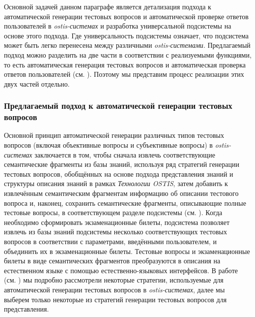 Основной задачей данном параграфе является детализация подхода к автоматической генерации тестовых вопросов и автоматической проверке ответов пользователей в \textit{ostis-системах} и разработка универсальной подсистемы на основе этого подхода. Где универсальность подсистемы означает, что подсистема может быть легко перенесена между различными \textit{ostis-системами}. Предлагаемый подход можно разделить на две части в соответствии с реализуемыми функциями, то есть автоматическая генерация тестовых вопросов и автоматическая проверка ответов пользователей (см. ). Поэтому мы представим процесс реализации этих двух частей отдельно.

\subsubsection{Предлагаемый подход к автоматической генерации тестовых вопросов}
\label{subsubsec_proposed_approach_automatic_generation_test_questions}

Основной принцип автоматической генерации различных типов тестовых вопросов (включая объективные вопросы и субъективные вопросы) в \textit{ostis-системах} заключается в том, чтобы сначала извлечь соответствующие семантические фрагменты из базы знаний, используя ряд стратегий генерации тестовых вопросов, обобщённых на основе подхода представления знаний и структуры описания знаний в рамках \textit{Технологии OSTIS}, затем добавить к извлечённым семантическим фрагментам информацию об описании тестового вопроса и, наконец, сохранить семантические фрагменты, описывающие полные тестовые вопросы, в соответствующем разделе подсистемы (см. ). Когда необходимо сформировать экзаменационные билеты, подсистема позволяет извлечь из базы знаний подсистемы несколько соответствующих тестовых вопросов в соответствии с параметрами, введёнными пользователем, и объединить их в экзаменационные билеты. Тестовые вопросы и экзаменационные билеты в виде семантических фрагментов преобразуются в описания на естественном языке с помощью естественно-языковых интерфейсов. В работе (см. ) мы подробно рассмотрели некоторые стратегии, используемые для автоматической генерации тестовых вопросов в \textit{ostis-системах}, далее мы выберем только некоторые из стратегий генерации тестовых вопросов для представления.

